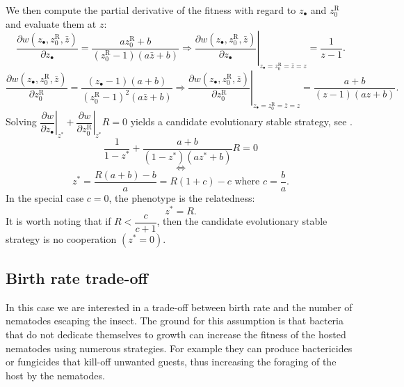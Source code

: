 \documentclass{article}
\begin{document}
  We then compute the partial derivative of the fitness with regard to $z_\bullet$ and $z_0^{\mathrm{R}}$ and evaluate them at $z$:
  \begin{equation}
  \dfrac{\partial w(z_\bullet ,z_0^{\mathrm{R}} , \bar{z} )}{\partial z_\bullet} = \dfrac{a z_0^{\mathrm{R}} +b }{ ( z_0^{\mathrm{R}} - 1) (a \bar{z} +b) } \Rightarrow \left. \dfrac{\partial w(z_\bullet ,z_0^{\mathrm{R}} , \bar{z} )}{\partial z_\bullet} \right\vert_{z_\bullet = z_0^{\mathrm{R}} = \bar{z}=z} = \dfrac{1}{ z-1 }.
  \end{equation}
  \begin{equation}
  \dfrac{\partial w(z_\bullet ,z_0^{\mathrm{R}} , \bar{z} )}{\partial z_0^{\mathrm{R}}} = \dfrac{(z_\bullet - 1)(a +b)}{(z_0^{\mathrm{R}} - 1)^2(a \bar{z} +b)} \Rightarrow \left. \dfrac{\partial w(z_\bullet ,z_0^{\mathrm{R}} , \bar{z} )}{\partial z_0^{\mathrm{R}}} \right\vert_{z_\bullet = z_0^{\mathrm{R}} = \bar{z}=z} = \dfrac{a +b}{( z - 1 )(a z +b)}.
  \end{equation}
  Solving $\left. \dfrac{\partial w}{\partial z_\bullet} \right\vert_{z^*} + \left. \dfrac{\partial w}{\partial z_0^{\mathrm{R}}} \right\vert_{z^*} R =0 $ yields a candidate evolutionary stable strategy, see \cite{rousset2004genetic}.
    \begin{equation}
  \dfrac{1}{ 1 - z^* } + \dfrac{a +b}{(1- z^*)(a z^* +b)}R =0
  \end{equation}
  \begin{equation}
  \iff
  \end{equation}
  \begin{equation}
  z^*=\dfrac{R(a+b)-b}{a}=R(1+c)-c \text{ where }c=\dfrac{b}{a}.
  \end{equation}
  In the special case $c=0$, the phenotype is the relatedness:
  \begin{equation}
  z^*=R.
  \end{equation} 
  It is worth noting that if $R<\dfrac{c}{c+1}$, then the candidate evolutionary stable strategy is no cooperation $(z^*=0)$.
  
  \subsection{Birth rate trade-off}
 In this case we are interested in a trade-off between birth rate and the number of nematodes escaping the insect. The ground for this assumption is that bacteria that do not dedicate themselves to growth can increase the fitness of the hosted nematodes using numerous strategies. For example they can produce bactericides or fungicides that kill-off unwanted guests, thus increasing the foraging of the host by the nematodes. 
\end{document}
